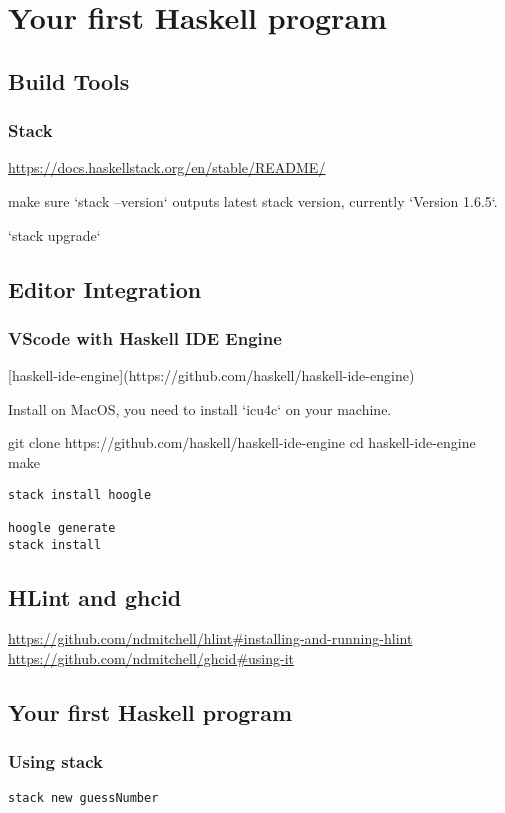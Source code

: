 \chapter{Your first Haskell program}

\section{Build Tools}
\subsection{Stack}

\url{https://docs.haskellstack.org/en/stable/README/}

make sure `stack --version` outputs latest stack version, currently `Version 1.6.5`.

`stack upgrade`
\section{Editor Integration}
\subsection{VScode with Haskell IDE Engine}
[haskell-ide-engine](https://github.com/haskell/haskell-ide-engine)

Install on MacOS, you need to install `icu4c` on your machine.

git clone https://github.com/haskell/haskell-ide-engine
cd haskell-ide-engine
make



\begin{verbatim}
stack install hoogle

hoogle generate
stack install
\end{verbatim}


\section{HLint and ghcid}

\url{https://github.com/ndmitchell/hlint#installing-and-running-hlint}
\url{https://github.com/ndmitchell/ghcid#using-it}

\section{Your first Haskell program}
\subsection{Using stack}
\verb|stack new guessNumber|

